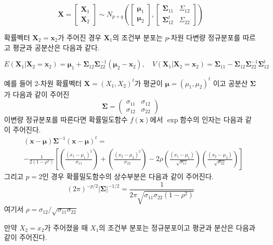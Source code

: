 \documentclass[
]{book}
\theoremstyle{definition}
\theoremstyle{definition}
\theoremstyle{definition}
\theoremstyle{remark}
\begin{document}
\[  \bm X =
    \begin{bmatrix}
  \bm X_1 \\
  \bm X_2
  \end{bmatrix}
  \sim
  N_{p+q} \left (
    \begin{bmatrix}
    \bm \mu_1 \\
    \bm \mu_2
    \end{bmatrix}
    ,\begin{bmatrix}
    \bm \Sigma_{11} & \Sigma_{12} \\
    \bm \Sigma^t_{12} & \Sigma_{22}
    \end{bmatrix}
    \right )
  \]

확률벡터 \(\bm X_2 = \bm x_2\)가 주어진 경우 \(\bm X_1\)의 조건부 분포는 \(p\)-차원 다변량 정규분포를 따르고 평균과 공분산은 다음과 같다.

\[ 
  E(\bm X_1 | \bm X_2 = \bm x_2 ) = \bm \mu_1 + \bm \Sigma_{12} \bm \Sigma^{-1}_{22} (\bm \mu_2 - \bm x_2), \quad
  V(\bm X_1 | \bm X_2 = \bm x_2 )  = \bm \Sigma_{11} -\bm \Sigma_{12} \bm \Sigma^{-1}_{22} \bm \Sigma^t_{12}
  \]

예를 들어 \(2\)-차원 확률벡터 \(\bm X=(X_1, X_2)^t\)가 평균이 \(\bm \mu=(\mu_1,\mu_2)^t\) 이고
공분산 \(\bm \Sigma\)가 다음과 같이 주어진
\begin{equation*}
\bm \Sigma =
  \begin{pmatrix}
\sigma_{11} & \sigma_{12} \\
\sigma_{12} & \sigma_{22}
\end{pmatrix}
\end{equation*}
이변량 정규분포를 따른다면 확률밀도함수 \(f(\bm x)\)에서 \(\exp\)함수의 인자는 다음과 같이 주어진다.
\begin{eqnarray*}
&(\bm x-\bm \mu) \bm \Sigma^{-1}(\bm x-\bm \mu)^t
= \\
&-\frac{1}{2 (1-\rho^2)} 
\left [ 
  \left ( \frac{(x_1-\mu_1)^2}{\sigma_{11}} \right )
  +\left ( \frac{(x_2-\mu_2)^2}{\sigma_{22}} \right )
  -2 \rho \left ( \frac{(x_1-\mu_1)}{\sqrt{\sigma_{11}}} \right )
  \left ( \frac{(x_2-\mu_2)}{\sqrt{\sigma_{22}}} \right )
  \right ]
\end{eqnarray*}
그리고 \(p=2\)인 경우 확률밀도함수의 상수부분은 다음과 같이 주어진다.
\[ (2 \pi)^{-p/2} | \bm \Sigma|^{-1/2} = \frac{1}{ 2 \pi \sqrt{\sigma_{11} \sigma_{22} (1-\rho^2)}} \]
여기서 \(\rho = \sigma_{12} / \sqrt{\sigma_{11} \sigma_{22}}\)

만약 \(X_2 = x_2\)가 주어졌을 때 \(X_1\)의 조건부 분포는 정규분포이고 평균과 분산은 다음과 같이 주어진다.
\end{document}
